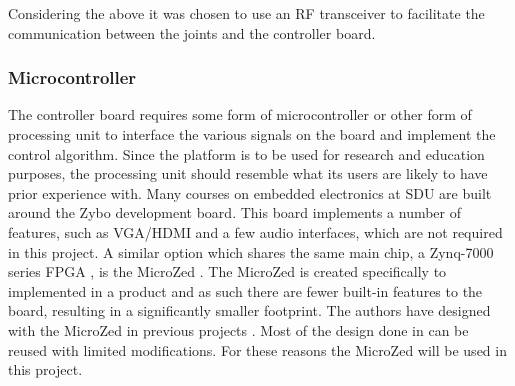 Considering the above it was chosen to use an RF transceiver to facilitate the communication between the joints and the controller board.

\subsubsection{Microcontroller} %
\label{ssub:microcontroller}
The controller board requires some form of microcontroller or other form of processing unit to interface the various signals on the board and implement the control algorithm.
Since the platform is to be used for research and education purposes, the processing unit should resemble what its users are likely to have prior experience with.
Many courses on embedded electronics at SDU are built around the Zybo development board\cite{zybo}.
This board implements a number of features, such as VGA/HDMI and a few audio interfaces, which are not required in this project.
A similar option which shares the same main chip, a Zynq-7000 series FPGA \cite{zynq}, is the MicroZed \cite{microzed}.
The MicroZed is created specifically to implemented in a product and as such there are fewer built-in features to the board, resulting in a significantly smaller footprint.
The authors have designed with the MicroZed in previous projects \cite{isaswarm}.
Most of the design done in \cite{isaswarm} can be reused with limited modifications.
For these reasons the MicroZed will be used in this project.

